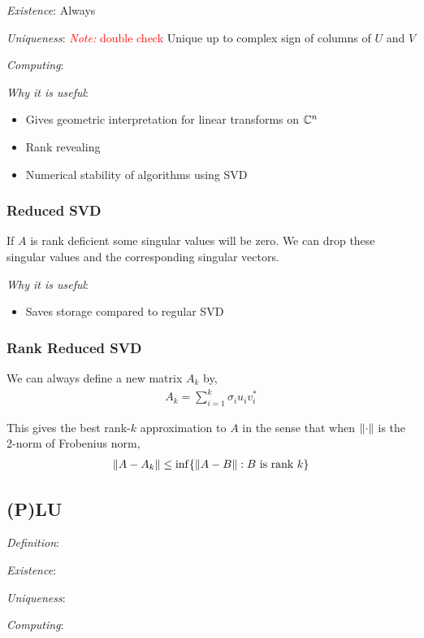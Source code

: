 \documentclass[12pt]{article}
\newcommand{\note}[1]{\textcolor{red}{\textit{Note:} #1}}
\begin{document}
\textit{Existence}:
Always

\textit{Uniqueness}:
\note{double check}
Unique up to complex sign of columns of \( U \) and \( V \)

\textit{Computing}:

\textit{Why it is useful}:
\begin{itemize}[nolistsep]
    \item Gives geometric interpretation for linear transforms on \( \mathbb{C}^n \)
    \item Rank revealing
    \item Numerical stability of algorithms using SVD
\end{itemize}

\subsubsection{Reduced SVD}
If \( A \) is rank deficient some singular values will be zero. We can drop these singular values and the corresponding singular vectors.

\textit{Why it is useful}:
\begin{itemize}[nolistsep]
    \item Saves storage compared to regular SVD
\end{itemize}

\subsubsection{Rank Reduced SVD}
We can always define a new matrix \( A_k \) by,
\begin{align*}
    A_k = \sum_{i=1}^{k} \sigma_i u_iv_i^*
\end{align*}

This gives the best rank-\( k \) approximation to \( A \) in the sense that when \( \left\lVert\cdot\right\rVert \) is the 2-norm of Frobenius norm,
\begin{align*}
    \left\lVert A-A_k\right\rVert \leq \operatorname{inf} \{ \left\lVert A-B\right\rVert : B\text{ is rank } k \}
\end{align*}



\subsection{(P)LU}
\textit{Definition}:

\textit{Existence}:

\textit{Uniqueness}:

\textit{Computing}:
\end{document}
